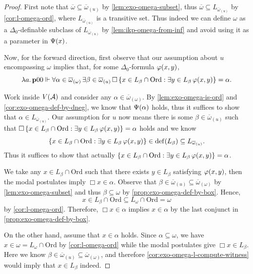 \documentclass[12pt,openany]{book}
\theoremstyle{plain}
\theoremstyle{definition}
\newcommand\opA[1]{\mathop{\forall #1}}
\newcommand\opE[1]{\mathop{\exists #1}}
\newcommand\oplam[1]{\mathop{\lambda #1.}}
\DeclareMathOperator\dd{def}
\newcommand\Ord{\mathrm{Ord}}
\newcommand\bp{\mathbf{p}}
\begin{document}
\begin{proof}
  First note that $\overline{\omega} \subseteq \overline{\omega}_{(u)}$ by \autoref{lem:exo-omega-subset}, thus $\overline{\omega} \subseteq L_{\overline{\omega}_{(u)}}$ by \autoref{cor:l-omega-ord}, where $L_{\overline{\omega}_{(u)}}$ is a transitive set. Thus indeed we can define $\omega$ as a $\Delta_0$-definable subclass of $L_{\overline{\omega}_{(u)}}$ by \autoref{lem:ikp-omega-from-inf} and avoid using it as a parameter in $\Psi\mleft(x\mright)$.

  Now, for the forward direction, first observe that our assumption about $u$ encompassing $\omega$ implies that, for some $\Delta_0$-formula $\varphi\mleft(x, y\mright)$,
  \[\oplam{a} \bp 00 \Vdash \opA{\alpha \in \overline{\omega}_{(\omega)}} \opE{\beta \in \overline{\omega}_{(u)}} \Box \left\{x \in L_\beta \cap \Ord : \opE{y \in L_\beta} \varphi\mleft(x, y\mright)\right\} = \alpha.\]

  Work inside $V\mleft(\mathcal{A}\mright)$ and consider any $\alpha \in \overline{\omega}_{(\omega)}$. By \autoref{lem:exo-omega-is-ord} and \autoref{cor:exo-omega-def-by-dneg}, we know that $\Psi\mleft(\alpha\mright)$ holds, thus it suffices to show that $\alpha \in L_{\overline{\omega}_{(u)}}$. Our assumption for $u$ now means there is some $\beta \in \overline{\omega}_{(u)}$ such that $\Box \left\{x \in L_\beta \cap \Ord : \opE{y \in L_\beta} \varphi\mleft(x, y\mright)\right\} = \alpha$ holds and we know
  \[\left\{x \in L_\beta \cap \Ord : \opE{y \in L_\beta} \varphi\mleft(x, y\mright)\right\} \in \dd\mleft(L_\beta\mright) \subseteq L_{\overline{\omega}_{(u)}}.\]
  Thus it suffices to show that actually $\left\{x \in L_\beta \cap \Ord : \opE{y \in L_\beta} \varphi\mleft(x, y\mright)\right\} = \alpha$.

  We take any $x \in L_\beta \cap \Ord$ such that there exists $y \in L_\beta$ satisfying $\varphi\mleft(x, y\mright)$, then the modal postulates imply $\Box x \in \alpha$. Observe that $\beta \in \overline{\omega}_{(u)} \subseteq \overline{\omega}_{(\omega)}$ by \autoref{lem:exo-omega-subset} and thus $\beta \subseteq \omega$ by \autoref{prop:exo-omega-def-by-box}. Hence,
  \[x \in L_\beta \cap \Ord \subseteq L_\omega \cap \Ord = \omega\]
  by \autoref{cor:l-omega-ord}. Therefore, $\Box x \in \alpha$ implies $x \in \alpha$ by the last conjunct in \autoref{prop:exo-omega-def-by-box}.

  On the other hand, assume that $x \in \alpha$ holds. Since $\alpha \subseteq \omega$, we have $x \in \omega = L_\omega \cap \Ord$ by \autoref{cor:l-omega-ord} while the modal postulates give $\Box x \in L_\beta$. Here we know $\beta \in \overline{\omega}_{(u)} \subseteq \overline{\omega}_{(\omega)}$, and therefore \autoref{cor:exo-omega-l-compute-witness} would imply that $x \in L_\beta$ indeed.


\end{proof}
\end{document}
